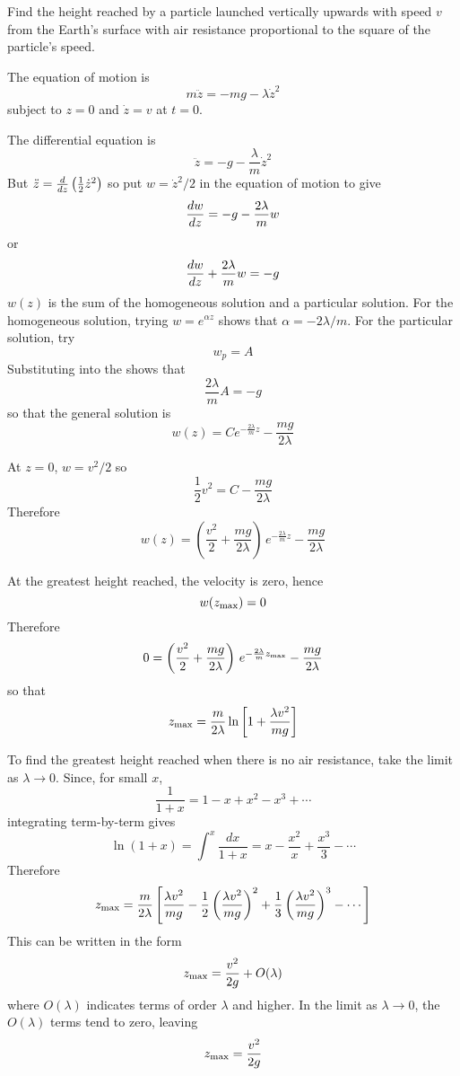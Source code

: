 \begin{example}
\problem Find the height reached by a particle launched vertically upwards 
with speed $v$ from the Earth's surface with air resistance proportional 
to the square of the particle's speed.

\solution The equation of motion is 
$$m\ddot{z}=-mg-\lambda\dot{z}^2$$
subject to $z=0$ and $\dot{z}=v$ at $t=0$.

The differential equation is
$$\ddot{z}=-g-\frac{\lambda}{m}\dot{z}^2$$
But $\ddot{z}=\frac{d}{d{z}}\left(\frac{1}{2}\dot{z}^2\right)$ so put 
$w=\dot{z}^2/2$ in the equation of motion to give
$$\frac{dw}{dz}=-g-\frac{2\lambda}{m}w$$
or
$$\frac{dw}{dz}+\frac{2\lambda}{m}w=-g$$
$w(z)$ is the sum of the homogeneous solution and a particular solution.  
For the homogeneous solution, trying $w=e^{\alpha z}$ shows that
$\alpha=-2\lambda/m$.  For the particular solution, try 
$$w_p=A$$
Substituting into the \ODE shows that
$$\frac{2\lambda}{m}A=-g$$
so that the general solution is
$$w(z)=Ce^{-\frac{2\lambda}{m}z}-\frac{mg}{2\lambda}$$

At $z=0$, $w=v^2/2$ so
$$\frac{1}{2}v^2=C-\frac{mg}{2\lambda}$$
Therefore
$$w(z)=\left(\frac{v^2}{2}+\frac{mg}{2\lambda}\right)
\,e^{-\frac{2\lambda}{m}z}-\frac{mg}{2\lambda}$$

At the greatest height reached, the velocity is zero, hence
$$w(z_{\rm max})=0$$
Therefore
$$0=\left(\frac{v^2}{2}+\frac{mg}{2\lambda}\right)
\,e^{-\frac{2\lambda}{m}z_{\rm max}}-\frac{mg}{2\lambda}$$
so that
$$z_{\rm max}=\frac{m}{2\lambda}\ln\left[1+\frac{\lambda v^2}{mg}\right]$$

To find the greatest height reached when there is no air resistance,
take the limit as $\lambda\to 0$.  Since, for small $x$,
$$\frac{1}{1+x}=1-x+x^2-x^3+\cdots$$
integrating term-by-term gives
$$\ln(1+x)=\int^x \frac{dx}{1+x}=x-\frac{x^2}{x}+\frac{x^3}{3}-\cdots$$
Therefore
$$z_{\rm max}=\frac{m}{2\lambda}\left[
\frac{\lambda v^2}{mg}-\frac{1}{2}\left(\frac{\lambda v^2}{mg}\right)^2
+\frac{1}{3}\left(\frac{\lambda v^2}{mg}\right)^3-\cdots\right]$$
This can be written in the form
$$z_{\rm max}=\frac{v^2}{2g}+O(\lambda)$$
where $O(\lambda)$ indicates terms of order $\lambda$ and higher.  In the
limit as $\lambda\to 0$, the $O(\lambda)$ terms tend to zero, leaving
$$z_{\rm max}=\frac{v^2}{2g}$$
\end{example}

